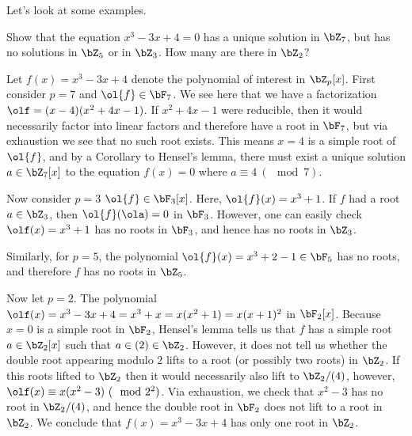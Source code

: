Let's look at some examples.

\begin{example}
	Show that the equation $x^3 - 3x + 4 = 0$ has a unique solution in $\bZ_7$, but has no solutions in $\bZ_5$ or in $\bZ_3$. How many are there in $\bZ_2$?
\end{example}
\begin{prf}
	Let $f(x) = x^3 - 3x + 4$ denote the polynomial of interest in $\bZ_p[x]$. First consider $p = 7$ and $\ol{f} \in \bF_7$. We see here that we have a factorization $\olf = (x - 4)(x^2 + 4x - 1)$. If $x^2 + 4x - 1$ were reducible, then it would necessarily factor into linear factors and therefore have a root in $\bF_7$, but via exhaustion we see that no such root exists. This means $x  = 4$ is a simple root of $\ol{f}$, and by a Corollary to Hensel's lemma, there must exist a unique solution $a \in \bZ_7[x]$ to the equation $f(x) = 0$ where $a \equiv 4 ~ (\mod 7)$.
	
	Now consider $p = 3$ $\ol{f} \in \bF_3[x]$. Here, $\ol{f}(x) = x^3 + 1$. If $f$ had a root $a \in \bZ_3$, then $\ol{f}(\ola) = 0$ in $\bF_3$. However, one can easily check $\olf(x) = x^3 + 1$ has no roots in $\bF_3$, and hence has no roots in $\bZ_3$.
	
	Similarly, for $p = 5$, the polynomial $\ol{f}(x) = x^3 + 2 - 1 \in \bF_5$ has no roots, and therefore $f$ has no roots in $\bZ_5$.
	
	Now let $p = 2$. The polynomial $\olf(x) = x^3 - 3x + 4= x^3 + x = x(x^2+1) = x(x+1)^2$ in $\bF_2[x]$. Because $x = 0$ is a simple root in $\bF_2$, Hensel's lemma tells us that $f$ has a simple root $a \in \bZ_2[x]$ such that $a \in (2) \in \bZ_2$. However, it does not tell us whether the double root appearing modulo $2$ lifts to a root (or possibly two roots) in $\bZ_2$. If this roots lifted to $\bZ_2$ then it would necessarily also lift to $\bZ_2/(4)$, however, $\olf(x) \equiv x(x^2 - 3) ~ (\mod 2^2)$. Via exhaustion, we check that $x^2 - 3$ has no root in $\bZ_2/(4)$, and hence the double root in $\bF_2$ does not lift to a root in $\bZ_2$. We conclude that $f(x) = x^3 - 3x + 4$ has only one root in $\bZ_2$.
\end{prf}

\newpage

